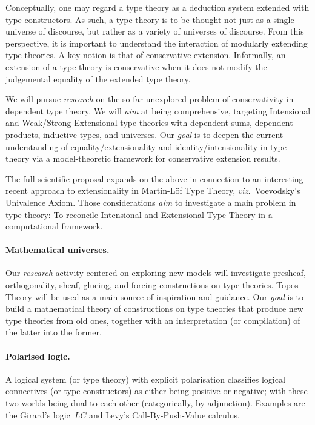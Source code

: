 \documentclass[11pt,twocolumn]{article}
\newcommand{\hl}{\emph}
\newcommand{\viz}{\emph{viz.}}
\newcommand{\LC}{\mbox{$LC$}}
\begin{document}
Conceptually, one may regard a type theory as a deduction system extended with
type constructors.  As such, a type theory is to be thought not just as a
single universe of discourse, but rather as a variety of universes of
discourse.  From this perspective, it is important to understand the
interaction of modularly extending type theories.  A key notion is that of
conservative extension.  Informally, an extension of a type theory is
conservative when it does not modify the judgemental equality of the extended
type theory.

We will pursue \hl{research} on the so far unexplored problem of
conservativity in dependent type theory.  We will \hl{aim} at being
comprehensive, targeting Intensional and Weak/Strong Extensional type theories
with dependent sums, dependent products, inductive types, and universes.  Our
\hl{goal} is to deepen the current understanding of equality/extensionality
and identity/intensionality in type theory via a model-theoretic framework for
conservative extension results.  

The full scientific proposal expands on the above in connection to an
interesting recent approach to extensionality in Martin-L\"of Type Theory,
\viz~Voevodsky's Univalence Axiom. %
Those considerations \hl{aim} to investigate a main problem in type
theory: To reconcile Intensional and Extensional Type Theory in a
computational framework.

\paragraph{Mathematical universes.}
\label{MethodologyMathematicalUniversesParagraph}

Our \hl{research} activity centered on exploring new models will investigate
pre\-sheaf, orthogonality, sheaf, glueing, and forcing constructions on type
theories.  Topos Theory %
will be used as a main source of inspiration and guidance.  Our \hl{goal}
is to build a mathematical theory of constructions on type theories that
produce new type theories from old ones, together with an interpretation
(or compilation) of the latter into the former.

\paragraph{Polarised logic.}
\label{PolarisationParagraph}

A logical system (or type theory) with explicit polarisation classifies
logical connectives (or type constructors) as either being positive or
negative; with these two worlds being dual to each other (categorically, by
adjunction).  Examples are the Girard's logic~{\LC} %
and Levy's Call-By-Push-Value calculus. %
\end{document}
